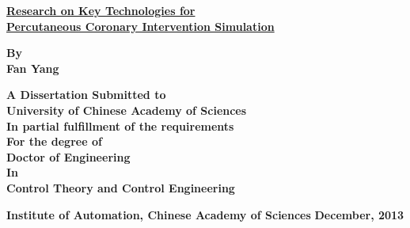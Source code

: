 
\renewcommand{\baselinestretch}{1.0}

\thispagestyle{empty} %

\vspace*{0.5cm} %
\begin{center} 
  {\xiaoerhao \hei \textrm{\textbf{\underline{Research on Key Technologies for}\\
  \underline{Percutaneous Coronary Intervention Simulation}}}}
\end{center}

\vspace*{3.5cm} %
\begin{center}

\textsf{\sanhao \textrm{\textbf{By}}}\\
\textsf{\sanhao \textrm{\textbf{Fan Yang}}}

\vspace*{2.0cm} %
\sihao \textrm{\textbf{ A Dissertation Submitted to\\
University of Chinese Academy of Sciences\\
In partial fulfillment of the requirements\\
For the degree of\\
Doctor of Engineering\\
In\\
Control Theory and Control Engineering}}
\end{center}

\begin{center}
\vspace{1.5cm} 
\sanhao \textrm{\textbf{Institute of Automation, Chinese Academy of Sciences}}
\sihao \textrm{\textbf{December, 2013}}
\end{center}

